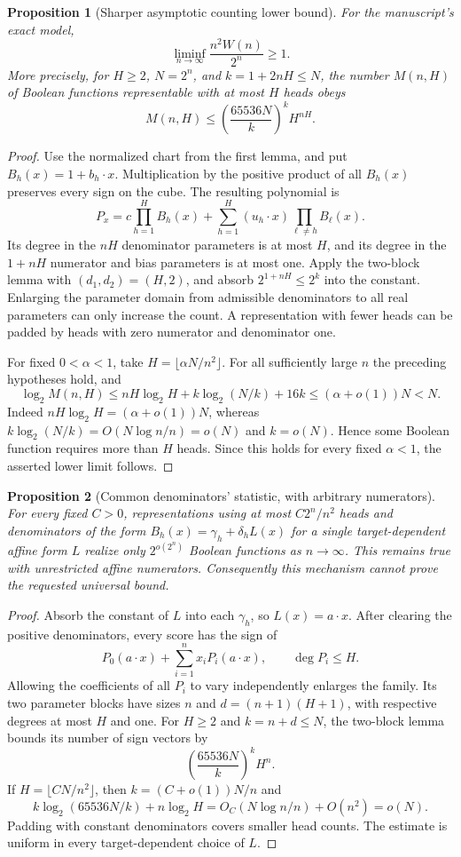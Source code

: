 \documentclass[11pt]{article}
\newtheorem{proposition}{Proposition}
\begin{document}
\begin{proposition}[Sharper asymptotic counting lower bound]
For the manuscript's exact model,
\[
 \liminf_{n\to\infty}\frac{n^2W(n)}{2^n}\ge1.
\]
More precisely, for $H\ge2$, $N=2^n$, and $k=1+2nH\le N$, the number
$M(n,H)$ of Boolean functions representable with at most $H$ heads obeys
\[
 M(n,H)\le \left(\frac{65536N}{k}\right)^k H^{nH}.
\]
\end{proposition}
\begin{proof}
Use the normalized chart from the first lemma, and put
$B_h(x)=1+b_h\cdot x$. Multiplication by the positive product of all
$B_h(x)$ preserves every sign on the cube. The resulting polynomial is
\[
 P_x=c\prod_{h=1}^H B_h(x)+
       \sum_{h=1}^H(u_h\cdot x)\prod_{\ell\ne h}B_\ell(x).
\]
Its degree in the $nH$ denominator parameters is at most $H$, and its
degree in the $1+nH$ numerator and bias parameters is at most one.
Apply the two-block lemma with $(d_1,d_2)=(H,2)$, and absorb
$2^{1+nH}\le2^k$ into the constant. Enlarging the parameter domain
from admissible denominators to all real parameters can only increase
the count. A representation with fewer heads can be padded by heads
with zero numerator and denominator one.

For fixed $0<\alpha<1$, take $H=\lfloor\alpha N/n^2\rfloor$.
For all sufficiently large $n$ the preceding hypotheses hold, and
\[
 \log_2 M(n,H)
 \le nH\log_2 H+k\log_2(N/k)+16k
 \le (\alpha+o(1))N<N.
\]
Indeed $nH\log_2H=(\alpha+o(1))N$, whereas
$k\log_2(N/k)=O(N\log n/n)=o(N)$ and $k=o(N)$.
Hence some Boolean function requires more than $H$ heads. Since this
holds for every fixed $\alpha<1$, the asserted lower limit follows.
\end{proof}

\begin{proposition}[Common denominators' statistic, with arbitrary numerators]
For every fixed $C>0$, representations using at most $C2^n/n^2$ heads
and denominators of the form
$B_h(x)=\gamma_h+\delta_hL(x)$ for a single target-dependent affine
form $L$ realize only $2^{o(2^n)}$ Boolean functions as $n\to\infty$.
This remains true with unrestricted affine numerators.
Consequently this mechanism cannot prove the requested universal bound.
\end{proposition}
\begin{proof}
Absorb the constant of $L$ into each $\gamma_h$, so $L(x)=a\cdot x$.
After clearing the positive denominators, every score has the sign of
\[
 P_0(a\cdot x)+\sum_{i=1}^n x_iP_i(a\cdot x),
 \qquad \deg P_i\le H.
\]
Allowing the coefficients of all $P_i$ to vary independently enlarges
the family. Its two parameter blocks have sizes $n$ and
$d=(n+1)(H+1)$, with respective degrees at most $H$ and one.
For $H\ge2$ and $k=n+d\le N$, the two-block lemma bounds its number
of sign vectors by
\[
 \left(\frac{65536N}{k}\right)^k H^n.
\]
If $H=\lfloor CN/n^2\rfloor$, then $k=(C+o(1))N/n$ and
\[
 k\log_2(65536N/k)+n\log_2H
 =O_C(N\log n/n)+O(n^2)=o(N).
\]
Padding with constant denominators covers smaller head counts.
The estimate is uniform in every target-dependent choice of $L$.
\end{proof}
\end{document}
